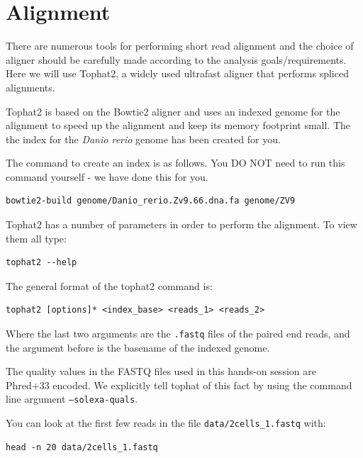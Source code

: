 \section{Alignment}
There are numerous tools for performing short read alignment and the choice of aligner
should be carefully made according to the analysis goals/requirements. Here we will
use Tophat2, a widely used ultrafast aligner that performs spliced alignments.

Tophat2 is based on the Bowtie2 aligner and uses an indexed genome for the
alignment to speed up the alignment and keep its memory footprint small. 
The the index for the \textit{Danio rerio} genome has been created for you. 

\begin{warning}
The command to create an index is as follows. You DO NOT need to run this command
yourself - we have done this for you.
\begin{lstlisting}
bowtie2-build genome/Danio_rerio.Zv9.66.dna.fa genome/ZV9
\end{lstlisting}
\end{warning}

\begin{steps}
Tophat2 has a number of parameters in order to perform the alignment. To view them all type:
\begin{lstlisting}
tophat2 --help
\end{lstlisting}
\end{steps}

\begin{information}
The general format of the tophat2 command is:
\begin{lstlisting}[style=command_syntax]
tophat2 [options]* <index_base> <reads_1> <reads_2>
\end{lstlisting}

Where the last two arguments are the \texttt{.fastq} files of the paired end
reads, and the argument before is the basename of the indexed genome.
\end{information}

\begin{note}
The quality values in the FASTQ files used in this hands-on session are Phred+33
encoded. We explicitly tell tophat of this fact by using the command line
argument \texttt{--solexa-quals}.
\end{note}

\begin{information}
You can look at the first few reads in the file \texttt{data/2cells\_1.fastq} with:
 
\begin{lstlisting}
head -n 20 data/2cells_1.fastq
\end{lstlisting}
\end{information}

